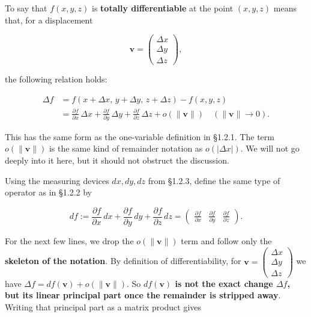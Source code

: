 To say that \(f(x,y,z)\) is \textbf{totally differentiable} at the point
\((x,y,z)\) means that, for a displacement

\[
\mathbf{v}=\begin{pmatrix}\Delta x\\\Delta y\\\Delta z\end{pmatrix},
\]

the following relation holds:

\[
\begin{aligned}
\Delta f
&=f(x+\Delta x,\,y+\Delta y,\,z+\Delta z)-f(x,y,z)\\
&=\frac{\partial f}{\partial x}\,\Delta x
{}+\frac{\partial f}{\partial y}\,\Delta y
{}+\frac{\partial f}{\partial z}\,\Delta z
{}+o(\|\mathbf{v}\|)\quad(\|\mathbf{v}\|\to0).
\end{aligned}
\]

This has the same form as the one-variable definition in §1.2.1. The
term \(o(\|\mathbf{v}\|)\) is the same kind of remainder notation as
\(o(|\Delta x|)\). We will not go deeply into it here, but it should not
obstruct the discussion.

Using the measuring devices \(dx,dy,dz\) from §1.2.3, define the same
type of operator as in §1.2.2 by

\[
df:=\frac{\partial f}{\partial x}\,dx+
\frac{\partial f}{\partial y}\,dy+
\frac{\partial f}{\partial z}\,dz
=
\begin{pmatrix}
\frac{\partial f}{\partial x}&
\frac{\partial f}{\partial y}&
\frac{\partial f}{\partial z}
\end{pmatrix}.
\]

For the next few lines, we drop the \(o(\|\mathbf{v}\|)\) term and
follow only the \textbf{skeleton of the notation}. By definition of
differentiability, for
\(\mathbf{v}=\begin{pmatrix}\Delta x\\\Delta y\\\Delta z\end{pmatrix}\)
we have \(\Delta f=df(\mathbf{v})+o(\|\mathbf{v}\|)\). So
\textbf{$df(\mathbf{v})$ is not the exact change $\Delta f$, but its linear principal part once the remainder is stripped away}.
Writing that principal part as a matrix product gives

